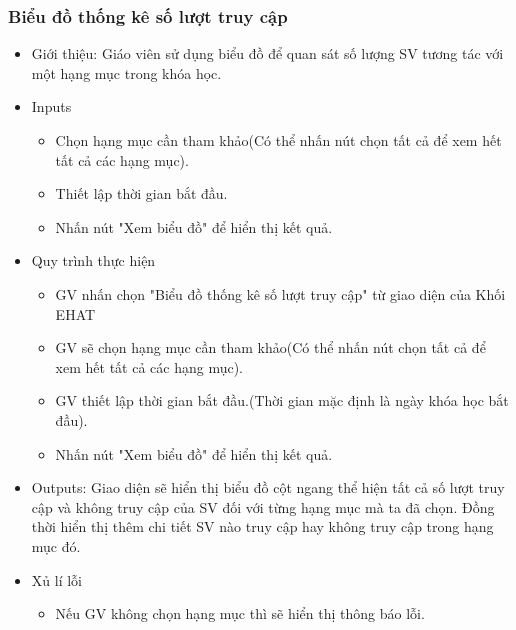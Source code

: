 \subsubsection{Biểu đồ thống kê số lượt truy cập}
\begin{itemize}
	\item Giới thiệu: Giáo viên sử dụng biểu đồ để quan sát số lượng SV tương tác với một hạng mục trong khóa học.
	\item Inputs
	\begin{itemize}
		\item Chọn hạng mục cần tham khảo(Có thể nhấn nút chọn tất cả để xem hết tất cả các hạng mục).
		\item Thiết lập thời gian bắt đầu.
		\item Nhấn nút "Xem biểu đồ" để hiển thị kết quả.
	\end{itemize}
	\item Quy trình thực hiện
	\begin{itemize}
		\item GV nhấn chọn "Biểu đồ thống kê số lượt truy cập" từ giao diện của Khối EHAT
		\item GV sẽ chọn hạng mục cần tham khảo(Có thể nhấn nút chọn tất cả để xem hết tất cả các hạng mục).
		\item GV thiết lập thời gian bắt đầu.(Thời gian mặc định là ngày khóa học bắt đầu).
		\item Nhấn nút "Xem biểu đồ" để hiển thị kết quả.
	\end{itemize}
	\item Outputs: Giao diện sẽ hiển thị biểu đồ cột ngang thể hiện tất cả số lượt truy cập và không truy cập của SV đối với từng hạng mục mà ta đã chọn. Đồng thời hiển thị thêm chi tiết SV nào truy cập hay không truy cập trong hạng mục đó.
	\item Xủ lí lỗi
	\begin{itemize}
		\item Nếu GV không chọn hạng mục thì sẽ hiển thị thông báo lỗi.
	\end{itemize}
\end{itemize}
